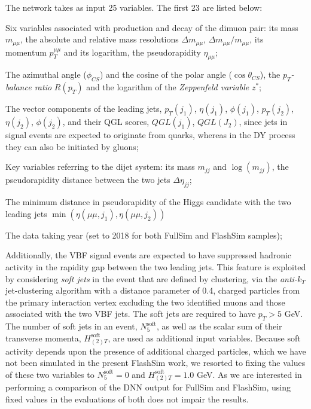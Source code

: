The network takes as input 25 variables. The first 23 are listed below:

\begin{outline}
\1 Six variables associated with production and decay of the dimuon pair: its mass $m_{\mu\mu}$, the absolute and relative mass resolutions $\Delta m_{\mu\mu}$, $\Delta m_{\mu\mu}/m_{\mu\mu}$, its momentum $p_T^{\mu\mu}$ and its logarithm, the pseudorapidity $\eta_{\mu\mu}$;

\1 The azimuthal angle ($\phi_{CS}$) and the cosine of the polar angle ($\cos\theta_{CS}$), the $p_T$\emph{-balance ratio} $R(p_T)$ and the logarithm of the \emph{Zeppenfeld variable} $z^*$;

\1 The vector components of the leading jets, $p_T(j_1)$, $\eta(j_1)$, $\phi(j_1)$, $p_T(j_2)$, $\eta(j_2)$, $\phi(j_2)$, and their QGL scores, $QGL(j_1)$, $QGL(J_2)$, since jets in signal events are expected to originate from quarks, whereas in the DY process they can also be initiated by gluons;

\1 Key variables referring to the dijet system: its mass $m_{jj}$ and $\log(m_{jj})$, the pseudorapidity distance between the two jets $\Delta \eta_{jj}$;

\1  The minimum distance in pseudorapidity of the Higgs candidate with the two leading jets $\min(\eta(\mu\mu, j_1),\eta(\mu\mu, j_2))$

\1 The data taking year (set to 2018 for both FullSim and FlashSim samples);
\end{outline}

Additionally, the VBF signal events are expected to have suppressed hadronic activity in the rapidity gap between the two leading jets. This feature is exploited by considering \emph{soft jets} in the event that are defined by clustering, via the \emph{anti-}$k_T$ jet-clustering algorithm with a distance parameter of 0.4, charged particles from the primary interaction vertex excluding the two identified muons and those associated with the two VBF jets. The soft jets are required to have $p_T>5$ GeV. The number of soft jets in an event, $N^{\text{soft}}_5$, as well as the scalar sum of their transverse momenta, $H^{\text{soft}}_{(2)T}$, are used as additional input variables. 
Because soft activity depends upon the presence of additional charged particles, which we have not been simulated in the present FlashSim work, we resorted to fixing the values of these two variables to $N^{\text{soft}}_5=0$ and $H^{\text{soft}}_{(2)T}=1.0$ GeV. As we are interested in performing a comparison of the DNN output for FullSim and FlashSim, using fixed values in the evaluations of both does not impair the results.

